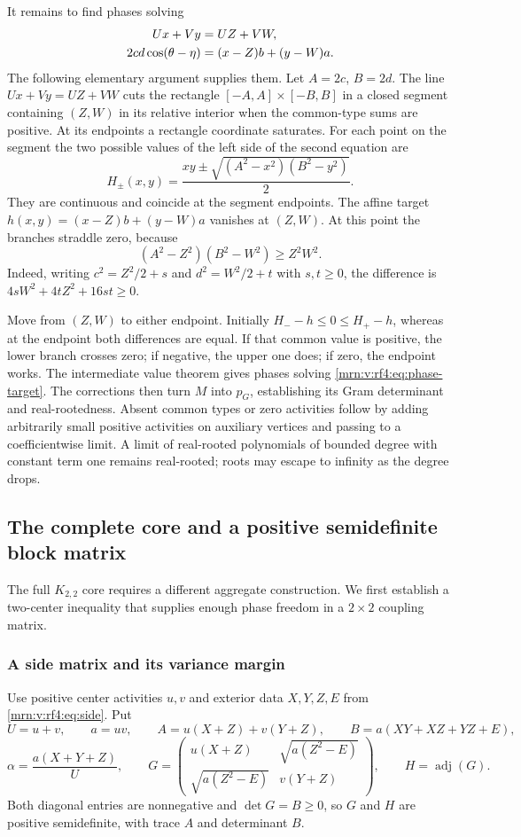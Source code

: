 \documentclass[11pt,a4paper]{article}
\theoremstyle{remark}\newtheorem{remark}[theorem]{Remark}
\newcommand{\adj}{\operatorname{adj}}      %
\begin{document}
It remains to find phases solving
\begin{align}\label{mrn:v:rf4:eq:phase-target}
Ux+Vy&=UZ+VW,\\
2cd\cos(\theta-\eta)&=(x-Z)b+(y-W)a.\notag
\end{align}
The following elementary argument supplies them. Let $A=2c$, $B=2d$. The line $Ux+Vy=UZ+VW$ cuts the rectangle $[-A,A]\times[-B,B]$ in a closed segment containing $(Z,W)$ in its relative interior when the common-type sums are positive. At its endpoints a rectangle coordinate saturates. For each point on the segment the two possible values of the left side of the second equation are
\[
H_\pm(x,y)=\frac{xy\pm\sqrt{(A^2-x^2)(B^2-y^2)}}2.
\]
They are continuous and coincide at the segment endpoints. The affine target
$h(x,y)=(x-Z)b+(y-W)a$ vanishes at $(Z,W)$. At this point the branches straddle zero, because
\[
(A^2-Z^2)(B^2-W^2)\ge Z^2W^2.
\]
Indeed, writing $c^2=Z^2/2+s$ and $d^2=W^2/2+t$ with $s,t\ge0$, the difference is
$4sW^2+4tZ^2+16st\ge0$.

Move from $(Z,W)$ to either endpoint. Initially $H_- -h\le0\le H_+-h$, whereas at the endpoint both differences are equal. If that common value is positive, the lower branch crosses zero; if negative, the upper one does; if zero, the endpoint works. The intermediate value theorem gives phases solving \eqref{mrn:v:rf4:eq:phase-target}. The corrections then turn $M$ into $p_G$, establishing its Gram determinant and real-rootedness. Absent common types or zero activities follow by adding arbitrarily small positive activities on auxiliary vertices and passing to a coefficientwise limit. A limit of real-rooted polynomials of bounded degree with constant term one remains real-rooted; roots may escape to infinity as the degree drops.

\subsection{The complete core and a positive semidefinite block matrix}\label{mrn:v:rf4:sec:full}

The full $K_{2,2}$ core requires a different aggregate construction. We first establish a two-center inequality that supplies enough phase freedom in a $2\times2$ coupling matrix.

\subsubsection{A side matrix and its variance margin}
Use positive center activities $u,v$ and exterior data $X,Y,Z,E$ from \eqref{mrn:v:rf4:eq:side}. Put
\[
U=u+v,\qquad a=uv,\qquad
A=u(X+Z)+v(Y+Z),\qquad B=a(XY+XZ+YZ+E),
\]
\[
\alpha=\frac{a(X+Y+Z)}U,\qquad
G=\begin{pmatrix}
u(X+Z)&\sqrt{a(Z^2-E)}\\
\sqrt{a(Z^2-E)}&v(Y+Z)
\end{pmatrix},\qquad H=\adj(G).
\]
Both diagonal entries are nonnegative and $\det G=B\ge0$, so $G$ and $H$ are positive semidefinite, with trace $A$ and determinant $B$.
\end{document}

